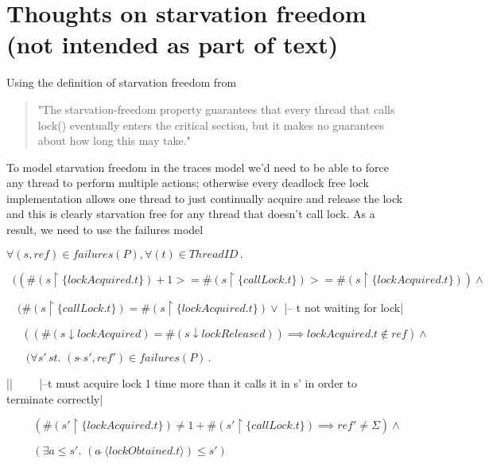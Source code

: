 \section{Thoughts on starvation freedom (not intended as part of text)}
Using the definition of starvation freedom from \cite{TAoMP} 
\begin{quote}
"The starvation-freedom property guarantees that every thread that calls lock()
eventually enters the critical section, but it makes no guarantees about how long
this may take."
\end{quote}

To model starvation freedom in the traces model we'd need to be able to force any thread to perform multiple actions; otherwise every deadlock free lock implementation allows one thread to just continually acquire and release the lock and this is clearly starvation free for any thread that doesn't call lock. As a result, we need to use the failures model 
\begin{flushleft}
$\forall(s,ref) \in failures(P), \forall(t) \in ThreadID \, . \,\, $

$\;\; ((\#(s \upharpoonright \{lockAcquired.t\}) + 1 >= \#(s \upharpoonright \{callLock.t\}) >= \#(s \upharpoonright \{lockAcquired.t\})) \wedge$

$\quad (\#(s \upharpoonright \{callLock.t\}) = \#(s \upharpoonright \{lockAcquired.t\}) \vee $ |-- t not waiting for lock|

$\quad\, \:((\#(s \downarrow lockAcquired) = \#(s \downarrow lockReleased)) \implies lockAcquired.t \notin ref) \wedge $ %


$\quad\, \:\, \: (\forall s' \, st. \,\, (s\,\hat{ }\,s', ref') \in failures(P) \,.\,\, $

||$\qquad \, \:$|--t must acquire lock 1 time more than it calls it in s' in order to terminate correctly|

$\qquad \, \:(\#(s' \upharpoonright \{lockAcquired.t\}) \neq 1 + \#(s' \upharpoonright \{callLock.t\}) \implies ref' \neq \Sigma) \wedge$

$\qquad \, \: (\exists a \leq s' . \,\, (a\, \hat{ }\,\langle lockObtained.t\rangle) \leq s')$

\end{flushleft}

